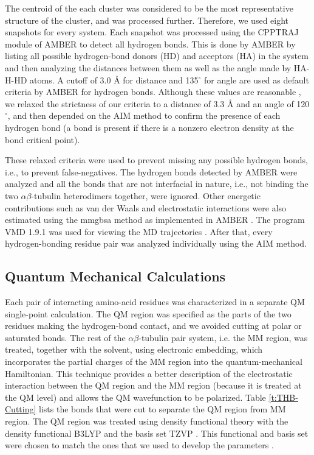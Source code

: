 \documentclass[11pt]{report}
\begin{document}
The centroid of the each cluster was considered to be the most representative structure of the cluster, and was processed further. Therefore, we used eight snapshots for every system. Each snapshot was processed using the CPPTRAJ module of AMBER to detect all hydrogen bonds. This is done by AMBER by listing all possible hydrogen-bond donors (HD) and acceptors (HA) in the system and then analyzing the distances between them as well as the angle made by HA-H-HD atoms. A cutoff of 3.0 \r{A} for distance and 135$^{\circ}$
for angle are used as default criteria by AMBER for hydrogen bonds. Although these values are reasonable
\cite{Wendler2010}, 
we relaxed the strictness of our criteria to a distance of 3.3 \r{A}
and an angle of 120$^{\circ}$, and then depended on
the AIM method to confirm the presence of each hydrogen bond (a bond is present if there is a nonzero electron density at the bond critical point).

These relaxed criteria were used to prevent missing any possible hydrogen
bonds, i.e., to prevent false-negatives. The hydrogen bonds detected by AMBER were analyzed and all the bonds that are not interfacial in nature, i.e., not binding the two $\alpha$$\beta$-tubulin heterodimers together, were ignored. Other energetic contributions such as van der Waals and electrostatic interactions were also estimated using the  \gls{mmgbsa} method as implemented in AMBER
\cite{Kollman2000}. 
The program VMD 1.9.1 was used for viewing the MD trajectories
\cite{Humphrey1996}. 
After that, every hydrogen-bonding residue pair was analyzed individually using the AIM method.

\subsection{Quantum Mechanical Calculations}
\label{ss:THB-Methods_QM}

Each pair of interacting amino-acid residues was characterized in a separate QM single-point calculation. The QM region was specified as the parts of the two residues making the hydrogen-bond contact, and we avoided cutting at polar or saturated bonds. The rest of the $\alpha$$\beta$-tubulin pair system, i.e. the MM region, was treated, together with the solvent, using electronic embedding, which incorporates the partial charges of the MM region into the quantum-mechanical Hamiltonian. This technique provides a better description of the electrostatic interaction between the QM region and the MM region (because it is treated at the QM level) and allows the QM wavefunction to be polarized. Table \ref{t:THB-Cutting} lists the bonds that were cut to separate the QM region from MM region. The QM region was treated using density functional theory with the density functional B3LYP
\cite{Becke1993,Lee1988,Vosko1980} 
and the basis set TZVP
\cite{Schaeffer1992,Schaeffer1994}. 
This functional and basis set were chosen to match the ones that we used to develop the parameters
\cite{Ayoub2014HB}.
\end{document}
